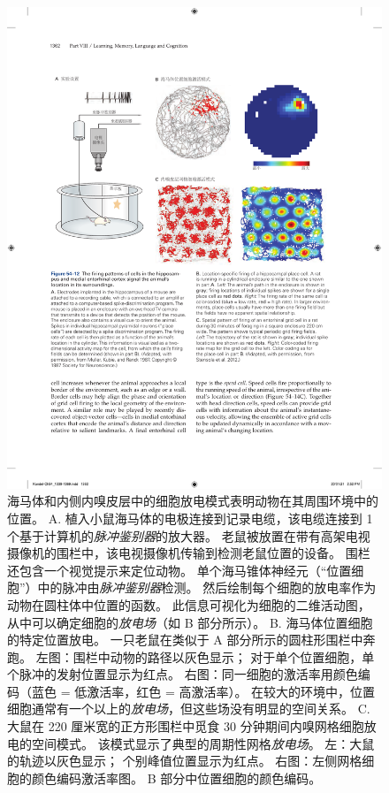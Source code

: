 \begin{figure}[htbp]
	\centering
	\includegraphics[width=1.0\linewidth]{chap54/fig_54_12}
	\caption{海马体和内侧内嗅皮层中的细胞放电模式表明动物在其周围环境中的位置。
		A. 植入小鼠海马体的电极连接到记录电缆，该电缆连接到 1 个基于计算机的\textit{脉冲鉴别器}的放大器。
		老鼠被放置在带有高架电视摄像机的围栏中，该电视摄像机传输到检测老鼠位置的设备。
		围栏还包含一个视觉提示来定位动物。
		单个海马锥体神经元（“位置细胞”）中的脉冲由\textit{脉冲鉴别器}检测。
		然后绘制每个细胞的放电率作为动物在圆柱体中位置的函数。
		此信息可视化为细胞的二维活动图，从中可以确定细胞的\textit{放电场}（如 B 部分所示）\cite{muller1987spatial}。
		B. 海马体位置细胞的特定位置放电。
		一只老鼠在类似于 A 部分所示的圆柱形围栏中奔跑。
		左图：围栏中动物的路径以灰色显示；
		对于单个位置细胞，单个脉冲的发射位置显示为红点。
		右图：同一细胞的激活率用颜色编码（蓝色 = 低激活率，红色 = 高激活率）。
		在较大的环境中，位置细胞通常有一个以上的\textit{放电场}，但这些场没有明显的空间关系。
		C. 大鼠在 220 厘米宽的正方形围栏中觅食 30 分钟期间内嗅网格细胞放电的空间模式。
		该模式显示了典型的周期性网格\textit{放电场}。
		左：大鼠的轨迹以灰色显示；
		个别峰值位置显示为红点。
		右图：左侧网格细胞的颜色编码激活率图。
		B 部分中位置细胞的颜色编码\cite{stensola2012entorhinal}。}
	\label{fig:54_12}
\end{figure}


